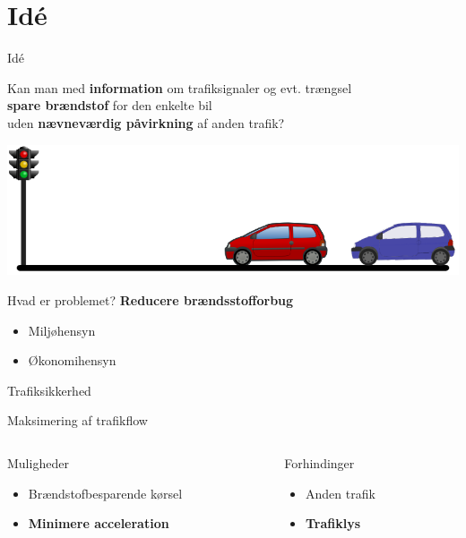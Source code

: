 \section{Idé}

\begin{frame}{Idé}
\begin{center}
Kan man med \textbf{information} om trafiksignaler og evt. trængsel\\\textbf{spare brændstof} for den enkelte bil\\uden \textbf{nævneværdig påvirkning} af anden trafik?
\end{center}
\includegraphics[width=1\textwidth]{images/figure.png}
\end{frame}

\begin{frame}{Hvad er problemet?}
\textbf{Reducere brændsstofforbug}
\begin{itemize}
\item Miljøhensyn
\item Økonomihensyn
\end{itemize}

Trafiksikkerhed

Maksimering af trafikflow

\vspace{5mm}
\begin{columns}
\begin{column}{0.5\textwidth}
Muligheder
\begin{itemize}
\item Brændstofbesparende kørsel
\item \textbf{Minimere acceleration}
\end{itemize}

\end{column}
\begin{column}{0.5\textwidth}
Forhindinger
\begin{itemize}
\item Anden trafik
\item \textbf{Trafiklys}
\end{itemize}
\end{column}
\end{columns}
\end{frame}

